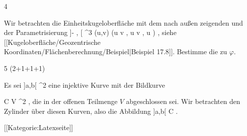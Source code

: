 {4}
{

Wir betrachten die Einheitskugeloberfläche mit dem nach außen zeigenden
und der Parametrisierung
\maabbeledisp {\varphi} {{]{- {  }},  {  } [} \times {]{-\pi}, \pi[} } {\R^3
} {(u,v)} {(\cos  u  \cos  v  , \cos  u  \sin  v  , \sin  u )
} {,}
siehe
[[Kugeloberfläche/Geozentrische Koordinaten/Flächenberechnung/Beispiel|Beispiel 17.8]].
Bestimme die
zu $\varphi$.

}
{} {}

{5 (2+1+1+1)}
{

Es sei
\maabb {\gamma} {]a,b[} { \R^2
} {}
eine
injektive Kurve mit der Bildkurve

\mavergleichskettedisp
{\vergleichskette
{ C
}
{ \subseteq} { V
}
{ \subseteq} { \R^2
}
{ } {
}
{ } {
}
}
{}{}{,}
die in der offenen Teilmenge $V$ abgeschlossen sei. Wir betrachten den Zylinder über diesen Kurven, also die Abbildung
 {]a,b[ \times \R } { C \times \R
} {.}

}
{} {}

 [[Kategorie:Latexseite]]
